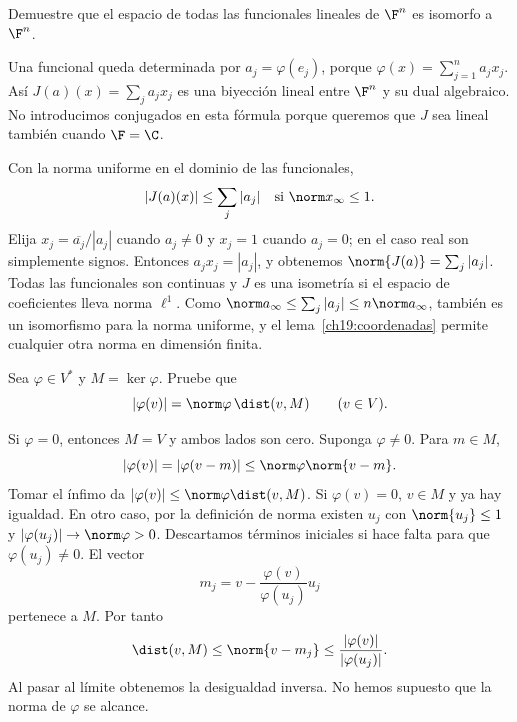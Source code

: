 \begin{ejercicio}
Demuestre que el espacio de todas las funcionales lineales de $\F^n$ es isomorfo a $\F^n$.
\end{ejercicio}
\begin{solucion}
Una funcional queda determinada por $a_j=\varphi(e_j)$, porque $\varphi(x)=\sum_{j=1}^n a_jx_j$. Así $J(a)(x)=\sum_j a_jx_j$ es una biyección lineal entre $\F^n$ y su dual algebraico. No introducimos conjugados en esta fórmula porque queremos que $J$ sea lineal también cuando $\F=\C$.

Con la norma uniforme en el dominio de las funcionales,
\[
 |J(a)(x)|\leq\sum_j|a_j|\quad\text{si }\norm x_\infty\leq1.
\]
Elija $x_j=\overline{a_j}/|a_j|$ cuando $a_j\ne0$ y $x_j=1$ cuando $a_j=0$; en el caso real son simplemente signos. Entonces $a_jx_j=|a_j|$, y obtenemos $\norm{J(a)}=\sum_j|a_j|$. Todas las funcionales son continuas y $J$ es una isometría si el espacio de coeficientes lleva norma $\ell^1$. Como $\norm a_\infty\leq\sum_j|a_j|\leq n\norm a_\infty$, también es un isomorfismo para la norma uniforme, y el lema~\ref{ch19:coordenadas} permite cualquier otra norma en dimensión finita.
\end{solucion}

\begin{ejercicio}
Sea $\varphi\in V^*$ y $M=\ker\varphi$. Pruebe que
\[|\varphi(v)|=\norm\varphi\,\dist(v,M)\qquad(v\in V).\]
\end{ejercicio}
\begin{solucion}
Si $\varphi=0$, entonces $M=V$ y ambos lados son cero. Suponga $\varphi\ne0$. Para $m\in M$,
\[
 |\varphi(v)|=|\varphi(v-m)|\leq\norm\varphi\norm{v-m}.
\]
Tomar el ínfimo da $|\varphi(v)|\leq\norm\varphi\dist(v,M)$. Si $\varphi(v)=0$, $v\in M$ y ya hay igualdad. En otro caso, por la definición de norma existen $u_j$ con $\norm{u_j}\leq1$ y $|\varphi(u_j)|\to\norm\varphi>0$. Descartamos términos iniciales si hace falta para que $\varphi(u_j)\ne0$. El vector
\[
 m_j=v-\frac{\varphi(v)}{\varphi(u_j)}u_j
\]
pertenece a $M$. Por tanto
\[
 \dist(v,M)\leq\norm{v-m_j}
 \leq\frac{|\varphi(v)|}{|\varphi(u_j)|}.
\]
Al pasar al límite obtenemos la desigualdad inversa. No hemos supuesto que la norma de $\varphi$ se alcance.
\end{solucion}


